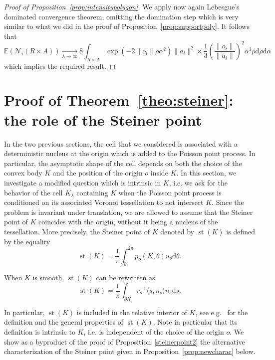 \documentclass[10pt]{amsart}
\theoremstyle{definition}\newtheorem{defi}[theo]{Definition}\newtheorem{rema}[theo]{Remark}\newtheorem{exam}[theo]{Example}\newtheorem{exem}[theo]{Example}\newtheorem{nota}[theo]{Notation}
\newcommand{\cN}{\mathcal{N}}
\newcommand{\dd}{\mathrm{d}}
\newcommand{\E}{\mathbb{E}}
\DeclareMathOperator{\st}{st}
\newcommand{\noi}{\noindent}
\begin{document}
\begin{proof}[{Proof of Proposition~\ref{prop:intensitypolygon}}]
We apply now again Lebesgue's dominated convergence theorem, omitting the domination step which is very similar to what we did in the proof of Proposition~\ref{prop:supportpoly}. It follows that
\[
\E(\cN_i(R\times A)) \underset{\lambda\to\infty}{\longrightarrow} 8\int_{R\times A} \exp\left(-2\|o_i\|\rho\alpha^2\right)\|a_i\|^2\times\frac1{3}\left(\frac{\|o_i\|}{\|a_i\|}\right)^2\alpha^3 \rho\dd\rho\dd\alpha
\]
which implies the required result.
\end{proof}



\section{Proof of Theorem~\ref{theo:steiner}: the role of the Steiner point}\label{sec:steiner}

In the two previous sections, the cell that we considered is associated with a deterministic nucleus at the origin which is added to the Poisson point process. In particular, the asymptotic shape of the cell depends on both the choice of the convex body $K$ and the position of the origin $o$ inside $K$. In this section, we investigate a modified question which is intrinsic in $K$, i.e. we ask for the behavior of the cell ${K}_{\lambda}$ containing $K$ when the Poisson point process is conditioned on its associated Voronoi tessellation to not intersect $K$. Since the problem is invariant under translation, we are allowed to assume that the Steiner point of $K$ coincides with the origin, without it being a nucleus of the tessellation. More precisely, the Steiner point of $K$ denoted by $\st(K)$ is defined by the equality
\begin{equation*}
\st (K)=\frac{1}{\pi}\int_0^{2\pi} p_o(K,\theta)u_\theta\dd\theta.
\end{equation*}

When $K$ is smooth, $\st (K)$ can be rewritten as
\begin{equation*}
\st (K)=\frac{1}{\pi}\int_{\partial K}r_s^{-1}\langle s,n_s\rangle n_s\dd s.
\end{equation*}

In particular, $\st (K)$ is included in the relative interior of $K$, see e.g.~\cite[Section~1.7]{Schneider} for the definition and the general properties of $\st (K)$. Note in particular that its definition is intrinsic to $K$, i.e. is independent of the choice of the origin $o$. We show as a byproduct of the proof of Proposition~\ref{steinerpoint2} the alternative characterization of the Steiner point given in Proposition~\ref{prop:newcharac} below.
\end{document}
